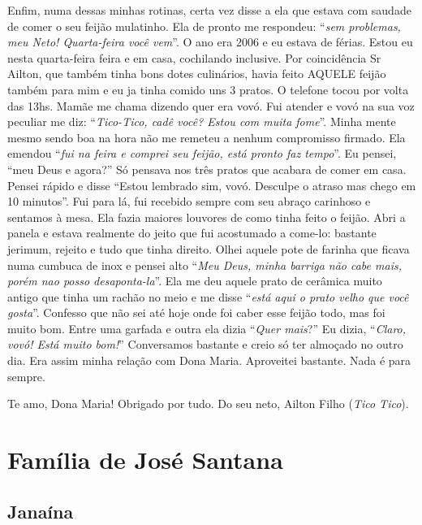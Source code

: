 \documentclass[
  brazil,
  a6paper,
  oneside,
  landscape,
  14pt]{scrbook}
\begin{document}
Enfim, numa dessas minhas rotinas, certa vez disse a ela que estava com
saudade de comer o seu feijão mulatinho. Ela de pronto me respondeu:
``\emph{sem problemas, meu Neto! Quarta-feira você vem}''. O ano era
2006 e eu estava de férias. Estou eu nesta quarta-feira feira e em casa,
cochilando inclusive. Por coincidência Sr Ailton, que também tinha bons
dotes culinários, havia feito AQUELE feijão também para mim e eu ja
tinha comido uns 3 pratos. O telefone tocou por volta das 13hs. Mamãe me
chama dizendo quer era vovó. Fui atender e vovó na sua voz peculiar me
diz: ``\emph{Tico-Tico, cadê você? Estou com muita fome}''. Minha mente
mesmo sendo boa na hora não me remeteu a nenhum compromisso firmado. Ela
emendou ``\emph{fui na feira e comprei seu feijão, está pronto faz
tempo}''. Eu pensei, ``meu Deus e agora?'' Só pensava nos três pratos
que acabara de comer em casa. Pensei rápido e disse ``Estou lembrado
sim, vovó. Desculpe o atraso mas chego em 10 minutos''. Fui para lá, fui
recebido sempre com seu abraço carinhoso e sentamos à mesa. Ela fazia
maiores louvores de como tinha feito o feijão. Abri a panela e estava
realmente do jeito que fui acostumado a come-lo: bastante jerimum,
rejeito e tudo que tinha direito. Olhei aquele pote de farinha que
ficava numa cumbuca de inox e pensei alto ``\emph{Meu Deus, minha
barriga não cabe mais, porém nao posso desaponta-la}''. Ela me deu
aquele prato de cerâmica muito antigo que tinha um rachão no meio e me
disse ``\emph{está aqui o prato velho que você gosta}''. Confesso que
não sei até hoje onde foi caber esse feijão todo, mas foi muito bom.
Entre uma garfada e outra ela dizia ``\emph{Quer mais}?'' Eu dizia,
``\emph{Claro, vovó! Está muito bom!}'' Conversamos bastante e creio só
ter almoçado no outro dia. Era assim minha relação com Dona Maria.
Aproveitei bastante. Nada é para sempre.

Te amo, Dona Maria! Obrigado por tudo. Do seu neto, Ailton Filho
(\emph{Tico Tico}).

\hypertarget{famuxedlia-de-josuxe9-santana}{%
\chapter{Família de José Santana}\label{famuxedlia-de-josuxe9-santana}}

\hypertarget{janauxedna}{%
\section{Janaína}\label{janauxedna}}
\end{document}
